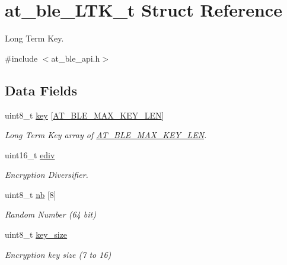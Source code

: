 \hypertarget{structat__ble___l_t_k__t}{}\section{at\+\_\+ble\+\_\+\+L\+T\+K\+\_\+t Struct Reference}
\label{structat__ble___l_t_k__t}


Long Term Key.  




{\ttfamily \#include $<$at\+\_\+ble\+\_\+api.\+h$>$}

\subsection*{Data Fields}
\begin{DoxyCompactItemize}
\item 
uint8\+\_\+t \mbox{\hyperlink{structat__ble___l_t_k__t_abdd5757e31504574b5dc0ee379bced9f}{key}} \mbox{[}\mbox{\hyperlink{at__ble__api_8h_a462eb50567c44d7284308fe058158e99}{A\+T\+\_\+\+B\+L\+E\+\_\+\+M\+A\+X\+\_\+\+K\+E\+Y\+\_\+\+L\+EN}}\mbox{]}
\begin{DoxyCompactList}\small\item\em Long Term Key array of \mbox{\hyperlink{at__ble__api_8h_a462eb50567c44d7284308fe058158e99}{A\+T\+\_\+\+B\+L\+E\+\_\+\+M\+A\+X\+\_\+\+K\+E\+Y\+\_\+\+L\+EN}}. \end{DoxyCompactList}\item 
uint16\+\_\+t \mbox{\hyperlink{structat__ble___l_t_k__t_aced7ac80397d2549e5ecbb13de235936}{ediv}}
\begin{DoxyCompactList}\small\item\em Encryption Diversifier. \end{DoxyCompactList}\item 
uint8\+\_\+t \mbox{\hyperlink{structat__ble___l_t_k__t_a3199b838db07457933ad33b42b04de39}{nb}} \mbox{[}8\mbox{]}
\begin{DoxyCompactList}\small\item\em Random Number (64 bit) \end{DoxyCompactList}\item 
uint8\+\_\+t \mbox{\hyperlink{structat__ble___l_t_k__t_af3a98d356308b40e81d30c28ed11c6b0}{key\+\_\+size}}
\begin{DoxyCompactList}\small\item\em Encryption key size (7 to 16) \end{DoxyCompactList}\end{DoxyCompactItemize}


